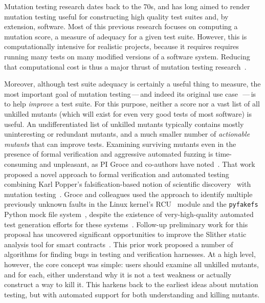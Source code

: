 Mutation testing research dates back to the 70s, and has long aimed to render
mutation testing useful for constructing high quality
test suites and, by extension, software.
Most of this previous
research focuses on computing a mutation score, a measure of adequacy for a
given test suite.  However, this is computationally intensive for realistic
projects, because it requires requires running many tests on many modified
versions of a software system.  Reducing that computational cost is thus a major
thrust of mutation testing research~\cite{jia2011analysis}.

Moreover, although test suite adequacy is certainly a useful thing to measure, the most
important goal of mutation testing\,---\,and indeed its original use
case~\cite{budd1980theoretical}\,---\,is to help \emph{improve} a test suite.  For this
purpose, neither a score nor a vast list of all unkilled mutants
(which will exist for even very good tests of most software) is useful.  An
undifferentiated list of unkilled mutants typically contains mostly uninteresting or
redundant mutants, and a much smaller number of \emph{actionable
  mutants} that can improve tests.  Examining
surviving mutants even in the presence of formal verification and
aggressive automated fuzzing  is
time-consuming and unpleasant, as PI Groce and co-authors have noted~\cite{groce2015verified,groce2018verified,mutKernel}.
%
That work proposed a novel approach to
formal verification and automated testing
combining Karl Popper's falsification-based notion of
scientific discovery~\cite{Popper,popperconjectures} with mutation
testing~\cite{groce2015verified,groce2018verified,mutKernel}.
Groce and colleagues used the
approach to identify multiple previously unknown faults in
the Linux kernel's
RCU~\cite{MathieuDesnoyers2012URCU,DinakarGuniguntala2008IBMSysJ,McKenney:2013:SDS:2483852.2483867}
module and the {\tt pyfakefs} Python mock file
system~\cite{pyfakefs}, despite the existence of very-high-quality
automated test generation efforts for these
systems~\cite{rcutorture,TSTL}.  Follow-up preliminary work for this
proposal has uncovered significant opportunities to improve the
Slither static analysis tool for smart
contracts~\cite{slitherpaper,slither-code}.  
This prior work
proposed a number of algorithms 
for finding bugs in testing and verification
harnesses.  At a high level, however,
the core concept was simple:  users should examine all unkilled
mutants, and for each, either  understand why it is not a test weakness or actually construct a way to kill it.  This harkens back to the
earliest ideas about mutation testing, but with
automated support for both understanding and killing
mutants. 

